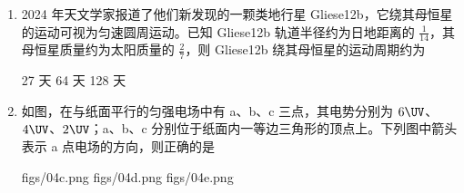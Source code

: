 \documentclass[\gkver]{gaokaozhenti}
\begin{document}
\begin{enumerate}
{则法线与竖直方向的夹角 $\alpha = \theta + i = 60^\circ$

根据光的折射定律可知 $n = \frac{\sin r}{\sin i}$

解得光线射出圆柱体时的折射角 $r = 45^\circ$

光线从圆柱体内射出时，与竖直方向的夹角为 $\beta = \alpha - r = 15^\circ$

故选 B。
}

\item
2024 年天文学家报道了他们新发现的一颗类地行星 Gliese12b，它绕其母恒星的运动可视为匀速圆周运动。已知 Gliese12b 轨道半径约为日地距离的 $\frac{1}{14}$，其母恒星质量约为太阳质量的 $\frac{2}{7}$，则 Gliese12b 绕其母恒星的运动周期约为

{27 天}
{64 天}
{128 天}


\item
如图，在与纸面平行的匀强电场中有 a、b、c 三点，其电势分别为 $6 \UV$、$4 \UV$、$2 \UV$；a、b、c 分别位于纸面内一等边三角形的顶点上。下列图中箭头表示 a 点电场的方向，则正确的是

\onepicture[w=3.69cm]{}

{figs/04c.png}
{figs/04d.png}
{figs/04e.png}

\end{enumerate}
\end{document}
